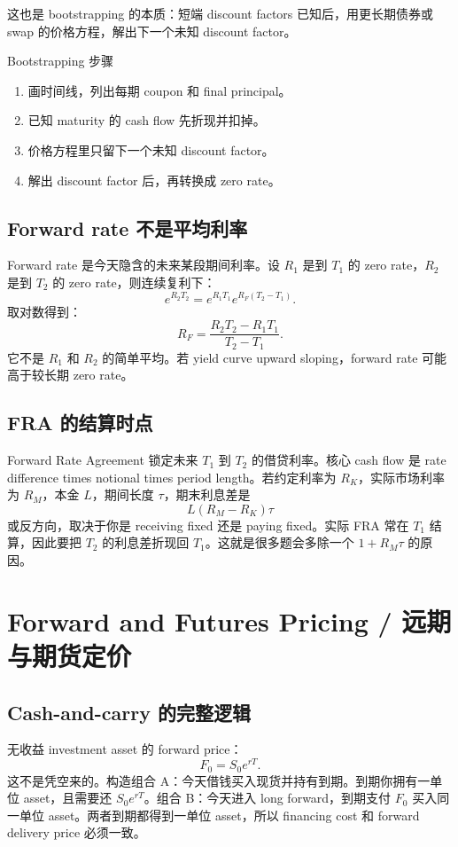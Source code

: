这也是 bootstrapping 的本质：短端 discount factors 已知后，用更长期债券或 swap 的价格方程，解出下一个未知 discount factor。

\begin{workflowbox}{Bootstrapping 步骤}
\begin{enumerate}
  \item 画时间线，列出每期 coupon 和 final principal。
  \item 已知 maturity 的 cash flow 先折现并扣掉。
  \item 价格方程里只留下一个未知 discount factor。
  \item 解出 discount factor 后，再转换成 zero rate。
\end{enumerate}
\end{workflowbox}

\subsection{Forward rate 不是平均利率}
Forward rate 是今天隐含的未来某段期间利率。设 $R_1$ 是到 $T_1$ 的 zero rate，$R_2$ 是到 $T_2$ 的 zero rate，则连续复利下：
\[
e^{R_2T_2}=e^{R_1T_1}e^{R_F(T_2-T_1)}.
\]
取对数得到：
\[
R_F=\frac{R_2T_2-R_1T_1}{T_2-T_1}.
\]
它不是 $R_1$ 和 $R_2$ 的简单平均。若 yield curve upward sloping，forward rate 可能高于较长期 zero rate。

\subsection{FRA 的结算时点}
Forward Rate Agreement 锁定未来 $T_1$ 到 $T_2$ 的借贷利率。核心 cash flow 是 rate difference times notional times period length。若约定利率为 $R_K$，实际市场利率为 $R_M$，本金 $L$，期间长度 $\tau$，期末利息差是
\[
L(R_M-R_K)\tau
\]
或反方向，取决于你是 receiving fixed 还是 paying fixed。实际 FRA 常在 $T_1$ 结算，因此要把 $T_2$ 的利息差折现回 $T_1$。这就是很多题会多除一个 $1+R_M\tau$ 的原因。

\section{Forward and Futures Pricing / 远期与期货定价}

\subsection{Cash-and-carry 的完整逻辑}
无收益 investment asset 的 forward price：
\[
F_0=S_0e^{rT}.
\]
这不是凭空来的。构造组合 A：今天借钱买入现货并持有到期。到期你拥有一单位 asset，且需要还 $S_0e^{rT}$。组合 B：今天进入 long forward，到期支付 $F_0$ 买入同一单位 asset。两者到期都得到一单位 asset，所以 financing cost 和 forward delivery price 必须一致。

